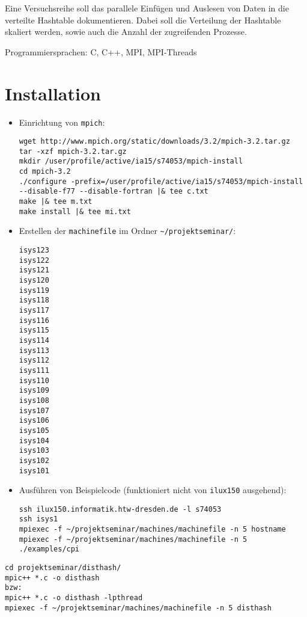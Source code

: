 \documentclass{scrreprt}
\begin{document}
Eine Versuchsreihe soll das parallele Einfügen und Auslesen von Daten in die verteilte Hashtable dokumentieren. Dabei soll die Verteilung der Hashtable skaliert werden, sowie auch die Anzahl der zugreifenden Prozesse.

Programmiersprachen: C, C++, MPI, MPI-Threads


\chapter{Installation}

\begin{itemize}
\item Einrichtung von \verb|mpich|:
\begin{lstlisting}
wget http://www.mpich.org/static/downloads/3.2/mpich-3.2.tar.gz
tar -xzf mpich-3.2.tar.gz
mkdir /user/profile/active/ia15/s74053/mpich-install
cd mpich-3.2
./configure -prefix=/user/profile/active/ia15/s74053/mpich-install --disable-f77 --disable-fortran |& tee c.txt
make |& tee m.txt
make install |& tee mi.txt
\end{lstlisting}

\item Erstellen der \verb|machinefile| im Ordner \verb|~/projektseminar/|:
\begin{lstlisting}
isys123
isys122
isys121
isys120
isys119
isys118
isys117
isys116
isys115
isys114
isys113
isys112
isys111
isys110
isys109
isys108
isys107
isys106
isys105
isys104
isys103
isys102
isys101
\end{lstlisting}
\item Ausführen von Beispielcode (funktioniert nicht von \verb|ilux150| ausgehend):
\begin{lstlisting}
ssh ilux150.informatik.htw-dresden.de -l s74053
ssh isys1
mpiexec -f ~/projektseminar/machines/machinefile -n 5 hostname
mpiexec -f ~/projektseminar/machines/machinefile -n 5 ./examples/cpi
\end{lstlisting}
\end{itemize}

\begin{lstlisting}
cd projektseminar/disthash/
mpic++ *.c -o disthash
bzw:
mpic++ *.c -o disthash -lpthread
mpiexec -f ~/projektseminar/machines/machinefile -n 5 disthash
\end{lstlisting}
\end{document}

